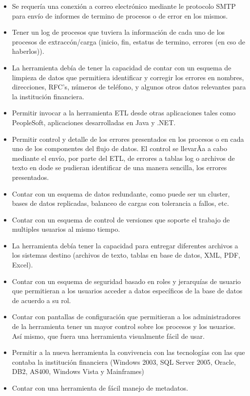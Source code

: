 \documentclass[a4paper,openright,12pt]{book}
\begin{document}
\begin{itemize}
\item Se requería una conexión a correo electrónico mediante le protocolo SMTP para envío de informes de termino de procesos o de error en los mismos.
\item Tener un log de procesos que tuviera la información de cada uno de los procesos de extraccón/carga  (inicio, fin, estatus de termino, errores (en cso de haberlos)).
\item La herramienta debía de tener la capacidad de contar con un esquema de limpieza de datos que permitiera identificar y corregir los errores en nombres, direcciones, RFC's, números de teléfono, y algunos otros datos relevantes para la institución financiera.
\item Permitir invocar a la herramienta ETL desde otras aplicaciones tales como PeopleSoft, aplicaciones desarrolladas en Java y .NET.
\item Permitir control y detalle de los errores presentados en los procesos o en cada uno de los componentes del flujo de datos. El control se llevarÃ­a a cabo mediante el envío, por parte del ETL, de errores a tablas log o archivos de texto en dode se pudieran identificar de una manera sencilla, los errores presentados.
\item Contar con un esquema de datos redundante, como puede ser un cluster, bases de datos replicadas, balanceo de cargas con tolerancia a fallos, etc.
\item Contar con un esquema de control de versiones que soporte el trabajo de multiples usuarios al mismo tiempo.
\item La herramienta debía tener la capacidad para entregar diferentes archivos a los sistemas destino (archivos de texto, tablas en base de datos, XML, PDF, Excel).
\item Contar con un esquema de seguridad basado en roles y jerarquías de usuario que permitieran a los usuarios acceder a datos específicos de la base de datos de acuerdo a su rol.
\item Contar con pantallas de configuración que permitieran a los administradores de la herramienta tener un mayor control sobre los procesos y los usuarios. Así mismo, que fuera una herramienta visualmente fácil de usar.
\item Permitir a la nueva herramienta la convivencia con las tecnologías con las que contaba la institución financiera (Windows 2003, SQL Server 2005, Oracle, DB2, AS400, Windows Vista y Mainframes)
\item Contar con una herramienta de fácil manejo de metadatos. 

\end{itemize}
\end{document}
